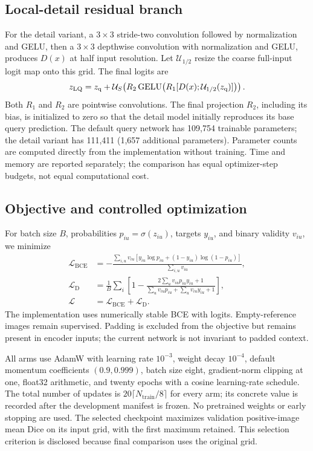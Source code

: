 \subsection{Local-detail residual branch}
For the detail variant, a $3\times3$ stride-two convolution followed by normalization and GELU, then a $3\times3$ depthwise convolution with normalization and GELU, produces $D(x)$ at half input resolution. Let $\mathcal U_{1/2}$ resize the coarse full-input logit map onto this grid. The final logits are
\begin{equation}
 z_{\mathrm{LQ}}=z_{\mathrm q}+\mathcal U_S\!\left(
 R_2\operatorname{GELU}\!\left(R_1[D(x);\mathcal U_{1/2}(z_{\mathrm q})]\right)\right).
\end{equation}
Both $R_1$ and $R_2$ are pointwise convolutions. The final projection $R_2$, including its bias, is initialized to zero so that the detail model initially reproduces its base query prediction. The default query network has 109,754 trainable parameters; the detail variant has 111,411 (1,657 additional parameters). Parameter counts are computed directly from the implementation without training. Time and memory are reported separately; the comparison has equal optimizer-step budgets, not equal computational cost.

\subsection{Objective and controlled optimization}
For batch size $B$, probabilities $p_{iu}=\sigma(z_{iu})$, targets $y_{iu}$, and binary validity $v_{iu}$, we minimize
\begin{align}
 \mathcal L_{\mathrm{BCE}}&=-\frac{\sum_{i,u}v_{iu}\left[y_{iu}\log p_{iu}+(1-y_{iu})\log(1-p_{iu})\right]}{\sum_{i,u}v_{iu}},\\
 \mathcal L_{\mathrm D}&=\frac1B\sum_i\left[1-
 \frac{2\sum_uv_{iu}p_{iu}y_{iu}+1}{\sum_uv_{iu}p_{iu}+\sum_uv_{iu}y_{iu}+1}\right],\\
 \mathcal L&=\mathcal L_{\mathrm{BCE}}+\mathcal L_{\mathrm D}.
\end{align}
The implementation uses numerically stable BCE with logits. Empty-reference images remain supervised. Padding is excluded from the objective but remains present in encoder inputs; the current network is not invariant to padded context.

All arms use AdamW with learning rate $10^{-3}$, weight decay $10^{-4}$, default momentum coefficients $(0.9,0.999)$, batch size eight, gradient-norm clipping at one, float32 arithmetic, and twenty epochs with a cosine learning-rate schedule. The total number of updates is $20\lceil N_{\mathrm{train}}/8\rceil$ for every arm; its concrete value is recorded after the development manifest is frozen. No pretrained weights or early stopping are used. The selected checkpoint maximizes validation positive-image mean Dice on its input grid, with the first maximum retained. This selection criterion is disclosed because final comparison uses the original grid.

